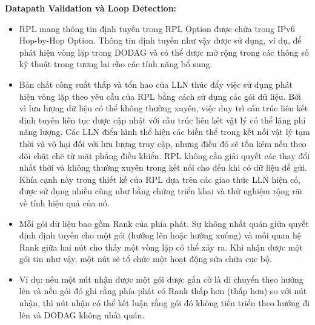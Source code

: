 \documentclass{report}
\begin{document}
\textbf{Datapath Validation và Loop Detection:}
\begin{itemize}
	\item RPL mang thông tin định tuyến trong RPL Option được chứa trong IPv6 Hop-by-Hop Option. Thông tin định tuyến như vậy được sử dụng, ví dụ, để phát hiện vòng lặp trong DODAG và có thể được mở rộng trong các thông số kỹ thuật trong tương lai cho các tính năng bổ sung.
	\item Bản chất công suất thấp và tổn hao của LLN thúc đẩy việc sử dụng phát hiện vòng lặp theo yêu cầu của RPL bằng cách sử dụng các gói dữ liệu. Bởi vì lưu lượng dữ liệu có thể không thường xuyên, việc duy trì cấu trúc liên kết định tuyến liên tục được cập nhật với cấu trúc liên kết vật lý có thể lãng phí năng lượng. Các LLN điển hình thể hiện các biến thể trong kết nối vật lý tạm thời và vô hại đối với lưu lượng truy cập, nhưng điều đó sẽ tốn kém nếu theo dõi chặt chẽ từ mặt phẳng điều khiển. RPL không cần giải quyết các thay đổi nhất thời và không thường xuyên trong kết nối cho đến khi có dữ liệu để gửi. Khía cạnh này trong thiết kế của RPL dựa trên các giao thức LLN hiện có, được sử dụng nhiều cũng như bằng chứng triển khai và thử nghiệm rộng rãi về tính hiệu quả của nó.
	\item Mỗi gói dữ liệu bao gồm Rank của phía phát. Sự không nhất quán giữa quyết định định tuyến cho một gói (hướng lên hoặc hướng xuống) và mối quan hệ Rank giữa hai nút cho thấy một vòng lặp có thể xảy ra. Khi nhận được một gói tin như vậy, một nút sẽ tổ chức một hoạt động sửa chữa cục bộ.
	\item Ví dụ: nếu một nút nhận được một gói được gắn cờ là di chuyển theo hướng lên và nếu gói đó ghi rằng phía phát có Rank thấp hơn (thấp hơn) so với nút nhận, thì nút nhận có thể kết luận rằng gói đó không tiến triển theo hướng đi lên và DODAG không nhất quán.
\end{itemize}
\end{document}
